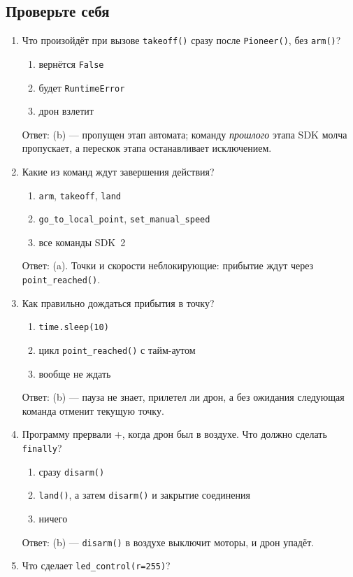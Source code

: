 \subsection{Проверьте себя}

\begin{enumerate}
  \item Что произойдёт при вызове \verb|takeoff()| сразу после \verb|Pioneer()|, без \verb|arm()|?
    \begin{enumerate}[label=(\alph*)] \item вернётся \verb|False| \item будет \verb|RuntimeError| \item дрон взлетит \end{enumerate}
    Ответ: (b) --- пропущен этап автомата; команду \emph{прошлого} этапа SDK молча пропускает, а перескок этапа останавливает исключением.
  \item Какие из команд ждут завершения действия?
    \begin{enumerate}[label=(\alph*)] \item \verb|arm|, \verb|takeoff|, \verb|land| \item \verb|go_to_local_point|, \verb|set_manual_speed| \item все команды SDK~2 \end{enumerate}
    Ответ: (a). Точки и скорости неблокирующие: прибытие ждут через \verb|point_reached()|.
  \item Как правильно дождаться прибытия в точку?
    \begin{enumerate}[label=(\alph*)] \item \verb|time.sleep(10)| \item цикл \verb|point_reached()| с тайм-аутом \item вообще не ждать \end{enumerate}
    Ответ: (b) --- пауза не знает, прилетел ли дрон, а без ожидания следующая команда отменит текущую точку.
  \item Программу прервали +, когда дрон был в воздухе. Что должно сделать \verb|finally|?
    \begin{enumerate}[label=(\alph*)] \item сразу \verb|disarm()| \item \verb|land()|, а затем \verb|disarm()| и закрытие соединения \item ничего \end{enumerate}
    Ответ: (b) --- \verb|disarm()| в воздухе выключит моторы, и дрон упадёт.
  \item Что сделает \verb|led_control(r=255)|?

\end{enumerate}
